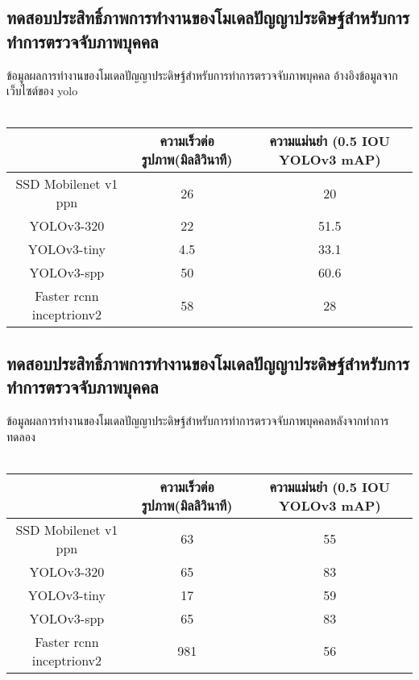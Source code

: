 
\subsection{ทดสอบประสิทธิ์ภาพการทำงานของโมเดลปัญญาประดิษฐ์สำหรับการทำการตรวจจับภาพบุคคล}
 ข้อมูลผลการทำงานของโมเดลปัญญาประดิษฐ์สำหรับการทำการตรวจจับภาพบุคคล อ้างอิงข้อมูลจากเว็บไซต์ของ yolo			\\
\\
\begin{tabular}{|c|c|c|}
		\hline
		{}&{ความเร็วต่อรูปภาพ(มิลลิวินาที)}&{ความแม่นยำ (0.5 IOU YOLOv3 mAP)}			\\
		\hline
		SSD Mobilenet v1 ppn	 		& 26				& 20														\\
		YOLOv3-320				& 22				& 51.5				\\	
		YOLOv3-tiny				& 4.5				& 33.1				\\
		YOLOv3-spp				& 50				& 60.6				\\	
		Faster rcnn inceptrionv2		& 58				& 28		\\
	\hline
\end{tabular}

\subsection{ทดสอบประสิทธิ์ภาพการทำงานของโมเดลปัญญาประดิษฐ์สำหรับการทำการตรวจจับภาพบุคคล}
ข้อมูลผลการทำงานของโมเดลปัญญาประดิษฐ์สำหรับการทำการตรวจจับภาพบุคคลหลังจากทำการทดลอง
\\\\
\begin{tabular}{|c|c|c|}
		\hline 
		{}&{ความเร็วต่อรูปภาพ(มิลลิวินาที)}&{ความแม่นยำ (0.5 IOU YOLOv3 mAP)}			\\
		\hline
		SSD Mobilenet v1 ppn	 					& 63 			& 55			\\
		YOLOv3-320							& 65			& 83			\\
		YOLOv3-tiny							& 17			& 59			\\
		YOLOv3-spp							& 65			& 83			\\	
		Faster rcnn inceptrionv2					& 981		& 56			\\
	\hline
\end{tabular}
